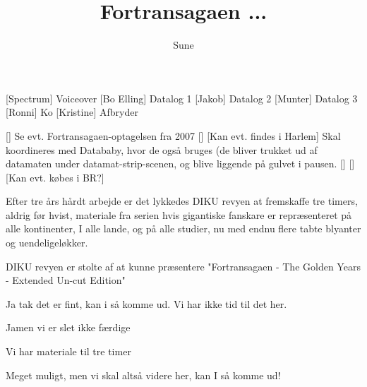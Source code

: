 \documentclass[a4paper,11pt]{article}
\title{Fortransagaen ...}
\author{Sune}
\begin{document}
\maketitle

\begin{roles}
[Spectrum] Voiceover
[Bo Elling] Datalog 1
[Jakob] Datalog 2
[Munter] Datalog 3
[Ronni] Ko
[Kristine] Afbryder
\end{roles}

\begin{props}
[] Se evt. Fortransagaen-optagelsen fra 2007
[]
[Kan evt. findes i Harlem] Skal koordineres med Datababy, hvor de også bruges (de bliver trukket ud af datamaten under datamat-strip-scenen, og blive liggende på gulvet i pausen.
[]
[]
[Kan evt. købes i BR?]
\end{props}

  
\begin{sketch}


 Efter tre års hårdt arbejde er det lykkedes DIKU revyen at fremskaffe tre timers, aldrig før hvist, materiale fra serien hvis gigantiske fanskare er repræsenteret på alle kontinenter, I alle lande, og på alle studier, nu med endnu flere tabte blyanter og uendeligeløkker.

 DIKU revyen er stolte af at kunne præsentere "Fortransagaen - The Golden Years - Extended Un-cut Edition"




 Ja tak det er fint, kan i så komme ud. Vi har ikke tid til det her.

 Jamen vi er slet ikke færdige

 Vi har materiale til tre timer

 Meget muligt, men vi skal altså videre her, kan I så komme ud!



\end{sketch}
\end{document}

